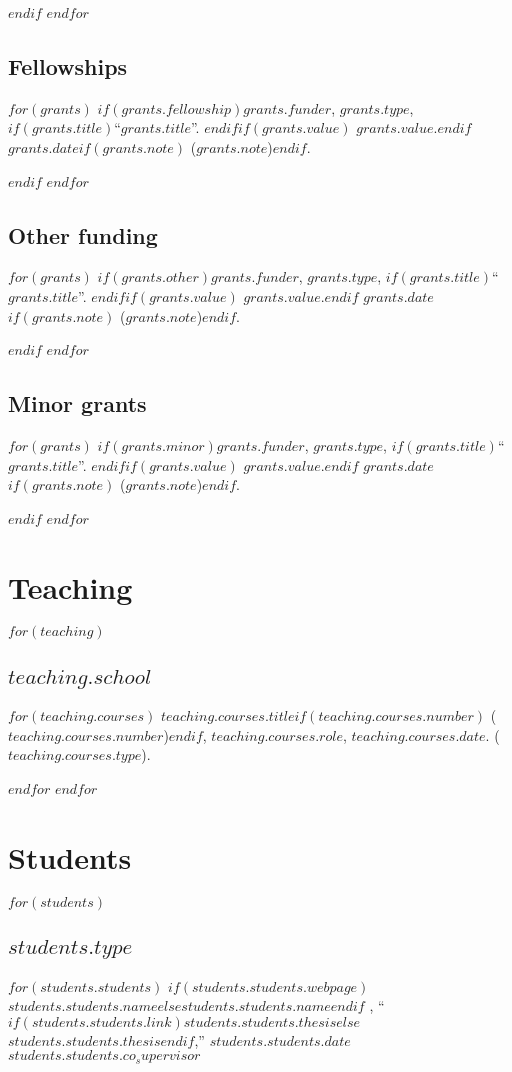 \documentclass[11pt]{article}
\begin{document}
$endif$
$endfor$

\subsection{Fellowships}
$for(grants)$
$if(grants.fellowship)$\ind \textit{$grants.funder$}, $grants.type$, $if(grants.title)$``$grants.title$''. $endif$$if(grants.value)$ $grants.value$.$endif$ $grants.date$$if(grants.note)$ ($grants.note$)$endif$.

$endif$
$endfor$

\subsection{Other funding}
$for(grants)$
$if(grants.other)$\ind \textit{$grants.funder$}, $grants.type$, $if(grants.title)$``$grants.title$''. $endif$$if(grants.value)$ $grants.value$.$endif$ $grants.date$$if(grants.note)$ ($grants.note$)$endif$.

$endif$
$endfor$


\subsection{Minor grants}
$for(grants)$
$if(grants.minor)$\ind \textit{$grants.funder$}, $grants.type$, $if(grants.title)$``$grants.title$''. $endif$$if(grants.value)$ $grants.value$.$endif$ $grants.date$$if(grants.note)$ ($grants.note$)$endif$.

$endif$
$endfor$



\section{Teaching}

$for(teaching)$
\subsection{$teaching.school$}
$for(teaching.courses)$
\ind $teaching.courses.title$$if(teaching.courses.number)$ ($teaching.courses.number$)$endif$, $teaching.courses.role$, $teaching.courses.date$. ($teaching.courses.type$).

$endfor$
$endfor$

\section{Students}

$for(students)$
\subsection{$students.type$}
$for(students.students)$
\ind $if(students.students.webpage)$\href{$students.students.webpage$}{$students.students.name$}$else$$students.students.name$$endif$ , ``$if(students.students.link)$\href{$students.students.link$}{$students.students.thesis$}$else$$students.students.thesis$$endif$,'' $students.students.date$ $students.students.co_supervisor$ 
\end{document}
